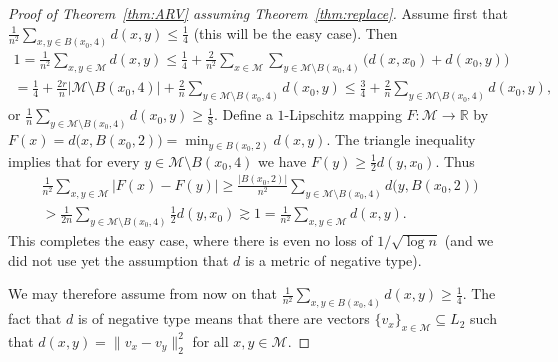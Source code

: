 \documentclass{icm2010}
\theoremstyle{definition}
\newcommand{\R}{\mathbb{R}}
\newcommand{\1}{\mathbf{1}}
\newcommand{\M}{\mathscr{M}}
\renewcommand{\le}{\leqslant}
\renewcommand{\ge}{\geqslant}
\begin{document}
\begin{proof}[Proof of Theorem~\ref{thm:ARV} assuming Theorem~\ref{thm:replace}]
Assume first that $\frac{1}{n^2}\sum_{x,y\in B(x_0,4)}d(x,y)\le
\frac14$ (this will be the easy case). Then
\begin{multline*}
1=\frac{1}{n^2}\sum_{x,y\in \M} d(x,y)\le \frac14+\frac{2}{n^2}\sum_{x\in \M}\sum_{y\in \M\setminus B(x_0,4)}\Big(d(x,x_0)+d(x_0,y)\Big)\\=\frac14+\frac{2r}{n}|\M\setminus B(x_0,4)|+\frac{2}{n}\sum_{y\in \M\setminus B(x_0,4)}d(x_0,y)\le \frac34+\frac{2}{n}\sum_{y\in \M\setminus B(x_0,4)}d(x_0,y),
\end{multline*}
or $\frac{1}{n}\sum_{y\in \M\setminus B(x_0,4)}d(x_0,y)\ge \frac18$.
Define a $1$-Lipschitz mapping $F:\M\to \R$ by
$F(x)=d\big(x,B(x_0,2)\big)=\min_{y\in B(x_0,2)} d(x,y)$.  The
triangle inequality implies that for every $y\in \M\setminus
B(x_0,4)$ we have $F(y)\ge \frac12d(y,x_0)$. Thus
\begin{multline*}
\frac{1}{n^2}\sum_{x,y\in \M} |F(x)-F(y)|\ge \frac{|B(x_0,2)|}{n^2}\sum_{y\in \M\setminus B(x_0,4)}d\big(y,B(x_0,2)\big)\\>\frac{1}{2n}\sum_{y\in \M\setminus B(x_0,4)}\frac12d(y,x_0)\gtrsim 1=\frac{1}{n^2}\sum_{x,y\in \M} d(x,y).
\end{multline*}
This completes the easy case, where there is even no loss of
$1/\sqrt{\log n}$ (and we did not use yet the assumption that $d$ is
a metric of negative type).


We may therefore assume from now on that $\frac{1}{n^2}\sum_{x,y\in
B(x_0,4)}d(x,y)\ge\frac14$.
The fact that $d$ is of negative type means that there are vectors $\{v_x\}_{x\in \M}\subseteq L_2$ such that $d(x,y)=\|v_x-v_y\|_2^2$ for all $x,y\in \M$. %


\end{proof}
\end{document}
